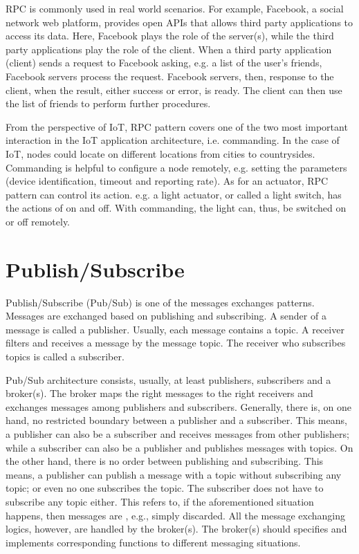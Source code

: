 RPC is commonly used in real world scenarios. For example, Facebook, a social network web platform, provides open APIs that allows third party applications to access its data. Here, Facebook plays the role of the server(s), while the third party applications play the role of the client. When a third party application (client) sends a request to Facebook asking, e.g. a list of the user's friends, Facebook servers process the request. Facebook servers, then, response to the client, when the result, either success or error, is ready. The client can then use the list of friends to perform further procedures. 

From the perspective of IoT, RPC pattern covers one of the two most important interaction in the IoT application architecture, i.e. commanding. In the case of IoT, nodes could locate on different locations from cities to countrysides. Commanding is helpful to configure a node remotely, e.g. setting the parameters (device identification, timeout and reporting rate). As for an actuator, RPC pattern can control its action. e.g. a light actuator, or called a light switch, has the actions of on and off. With commanding, the light can, thus, be switched on or off remotely.

\section{Publish/Subscribe}

Publish/Subscribe (Pub/Sub) is one of the messages exchanges patterns. Messages are exchanged based on publishing and subscribing. A sender of a message is called a publisher. Usually, each message contains a topic. A receiver filters and receives a message by the message topic. The receiver who subscribes topics is called a subscriber. 

Pub/Sub architecture consists, usually, at least publishers, subscribers and a broker(s). The broker maps the right messages to the right receivers and exchanges messages among publishers and subscribers. Generally, there is, on one hand, no restricted boundary between a publisher and a subscriber. This means, a publisher can also be a subscriber and receives messages from other publishers; while a subscriber can also be a publisher and publishes messages with topics. On the other hand, there is no order between publishing and subscribing. This means, a publisher can publish a message with a topic without subscribing any topic; or even no one subscribes the topic. The subscriber does not have to subscribe any topic either. This refers to, if the aforementioned situation happens, then messages are , e.g., simply discarded. All the message exchanging logics, however, are handled by the broker(s). The broker(s) should specifies and implements corresponding functions to different messaging situations. 

